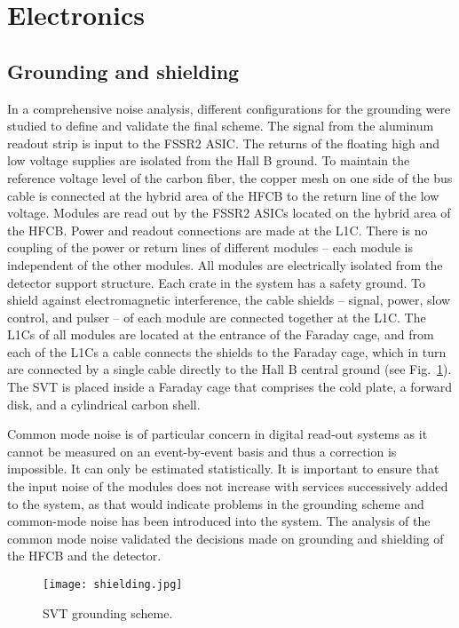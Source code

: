 \section{Electronics}

\subsection{Grounding and shielding}

In a comprehensive noise analysis, different configurations for the grounding were studied to define and validate the final scheme. The signal from the aluminum readout strip is input to the FSSR2 ASIC. The returns of the floating high and low voltage supplies are isolated from the Hall B ground. To maintain the reference voltage level of the carbon fiber, the copper mesh on one side of the bus cable is connected at the hybrid area of the HFCB to the return line of the low voltage. Modules are read out by the FSSR2 ASICs located on the hybrid area of the HFCB. Power and readout connections are made at the L1C. There is no coupling of the power or return lines of different modules -- each module is independent of the other modules. All modules are electrically isolated from the detector support structure. Each crate in the system has a safety ground. To shield against electromagnetic interference, the cable shields -- signal, power, slow control, and pulser -- of each module are connected together at the L1C. The L1Cs of all modules are located at the entrance of the Faraday cage, and from each of the L1Cs a cable connects the shields to the Faraday cage, which in turn are connected by a single cable directly to the Hall B central ground (see Fig.~\ref{fig:shielding}). The SVT is placed inside a Faraday cage that comprises the cold plate, a forward disk, and a cylindrical carbon shell. 

Common mode noise is of particular concern in digital read-out systems as it cannot be measured on an event-by-event basis and thus a correction is impossible. It can only be estimated statistically. It is important to ensure that the input noise of the modules does not increase with services successively added to the system, as that would indicate problems in the grounding scheme and common-mode noise has been introduced into the system. The analysis of the common mode noise validated the decisions made on grounding and shielding of the HFCB and the detector.

\begin{figure}[hbt] 
\centering 
\texttt{[image: shielding.jpg]}
\caption{SVT grounding scheme.}
\label{fig:shielding}
\end{figure}

